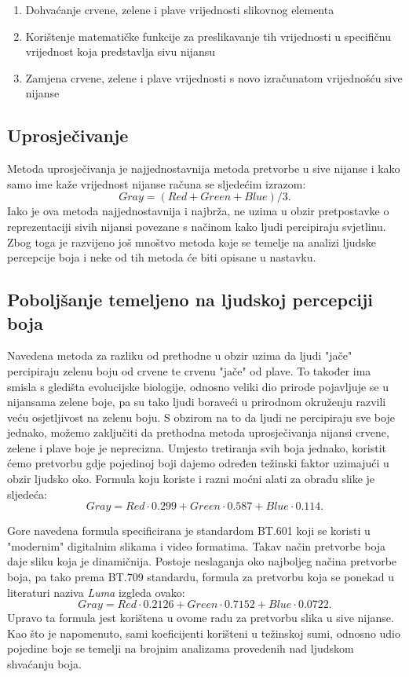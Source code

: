 \documentclass[times, utf8, diplomski]{fer}
\theoremstyle{definition}
\begin{document}
\begin{enumerate}
\item Dohvaćanje crvene, zelene i plave vrijednosti slikovnog elementa
\item Korištenje matematičke funkcije za preslikavanje tih vrijednosti u specifičnu vrijednost koja predstavlja sivu nijansu
\item Zamjena crvene, zelene i plave vrijednosti s novo izračunatom vrijednošću sive nijanse
\end{enumerate}

\subsection{Uprosječivanje}
Metoda uprosječivanja je najjednostavnija metoda pretvorbe u sive nijanse i kako samo ime kaže vrijednost nijanse računa se sljedećim izrazom:
\begin{equation}
Gray = (Red + Green + Blue) / 3.
\end{equation}
Iako je ova metoda najjednostavnija i najbrža, ne uzima u obzir pretpostavke o reprezentaciji sivih nijansi povezane s načinom kako ljudi percipiraju svjetlinu. Zbog toga je razvijeno još mnoštvo metoda koje se temelje na analizi ljudske percepcije boja i neke od tih metoda će biti opisane u nastavku.

\subsection{Poboljšanje temeljeno na ljudskoj percepciji boja}
Navedena metoda za razliku od prethodne u obzir uzima da ljudi "jače" percipiraju zelenu boju od crvene te crvenu "jače" od plave. To također ima smisla s gledišta evolucijske biologije, odnosno veliki dio prirode pojavljuje se u nijansama zelene boje, pa su tako ljudi boraveći u prirodnom okruženju razvili veću osjetljivost na zelenu boju. S obzirom na to da ljudi ne percipiraju sve boje jednako, možemo zaključiti da prethodna metoda uprosječivanja nijansi crvene, zelene i plave boje je neprecizna.
Umjesto tretiranja svih boja jednako, koristit ćemo pretvorbu gdje pojedinoj boji dajemo određen težinski faktor uzimajući u obzir ljudsko oko. Formula koju koriste i razni moćni alati za obradu slike je sljedeća:
\begin{equation}
Gray = Red \cdot 0.299 + Green \cdot 0.587 + Blue \cdot 0.114.
\end{equation}

Gore navedena formula specificirana je standardom BT.601 koji se koristi u "modernim" digitalnim slikama i video formatima. Takav način pretvorbe boja daje sliku koja je dinamičnija.
Postoje neslaganja oko najboljeg načina pretvorbe boja, pa tako prema BT.709 standardu, formula za pretvorbu koja se ponekad u literaturi naziva \textit{Luma} izgleda ovako:
\begin{equation}
Gray = Red \cdot 0.2126 + Green \cdot 0.7152 + Blue \cdot 0.0722.
\end{equation}
Upravo ta formula jest korištena u ovome radu za pretvorbu slika u sive nijanse.
Kao što je napomenuto, sami koeficijenti korišteni u težinskoj sumi, odnosno udio pojedine boje se temelji na brojnim analizama provedenih nad ljudskom shvaćanju boja.
\end{document}
